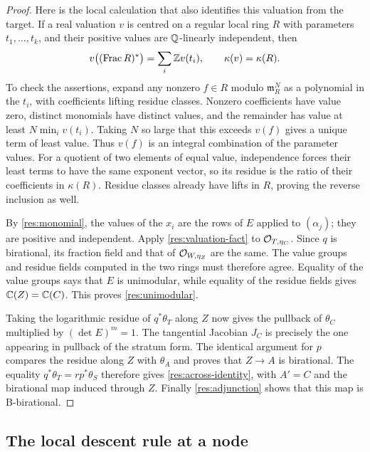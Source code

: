 \begin{proof}
 Here is the local calculation that also identifies this valuation
 from the target.  If a real valuation $v$ is centred on a regular
 local ring $R$ with parameters $t_1,\ldots,t_k$, and their positive
 values are $\mathbb Q$-linearly independent, then
 \begin{equation}\label{res:valuation-fact}
  v\bigl((\operatorname{Frac}R)^*\bigr)=\sum_i\mathbb Z v(t_i),
  \qquad \kappa(v)=\kappa(R).
 \end{equation}
 To check the assertions, expand any nonzero $f\in R$
 modulo $\mathfrak m_R^N$ as a polynomial in the $t_i$, with
 coefficients lifting residue classes.  Nonzero coefficients have
 value zero, distinct monomials have distinct values, and the
 remainder has value at least $N\min_i v(t_i)$.  Taking $N$ so large
 that this exceeds $v(f)$ gives a unique term of least value.  Thus
 $v(f)$ is an integral combination of the parameter values.  For a
 quotient of two elements of equal value, independence forces their
 least terms to have the same exponent vector, so its residue is
 the ratio of their coefficients in $\kappa(R)$.  Residue classes
 already have lifts in $R$, proving the reverse inclusion as well.

 By \eqref{res:monomial}, the values of the $x_i$ are the rows of
 $E$ applied to $(\alpha_j)$; they are positive and independent.
 Apply \eqref{res:valuation-fact} to $\mathcal O_{T,\eta_C}$.  Since $q$
 is birational, its fraction field and that of $\mathcal O_{W,\eta_Z}$
 are the same.  The value groups and residue fields computed in
 the two rings must therefore agree.  Equality of the value groups
 says that $E$ is unimodular, while equality of the residue fields
 gives $\mathbb C(Z)=\mathbb C(C)$.  This proves \eqref{res:unimodular}.

 Taking the logarithmic residue of $q^*\theta_T$ along $Z$ now gives
 the pullback of $\theta_C$ multiplied by $(\det E)^m=1$.
 The tangential Jacobian $J_C$ is precisely the one appearing in
 pullback of the stratum form.  The identical argument for $p$
 compares the residue along $Z$ with $\theta_A$ and proves that
 $Z\to A$ is birational.  The equality
 $q^*\theta_T=r p^*\theta_S$ therefore gives
 \eqref{res:across-identity}, with $A'=C$ and the birational map
 induced through $Z$.  Finally \eqref{res:adjunction} shows that
 this map is B-birational.
\end{proof}

\subsection{The local descent rule at a node}

